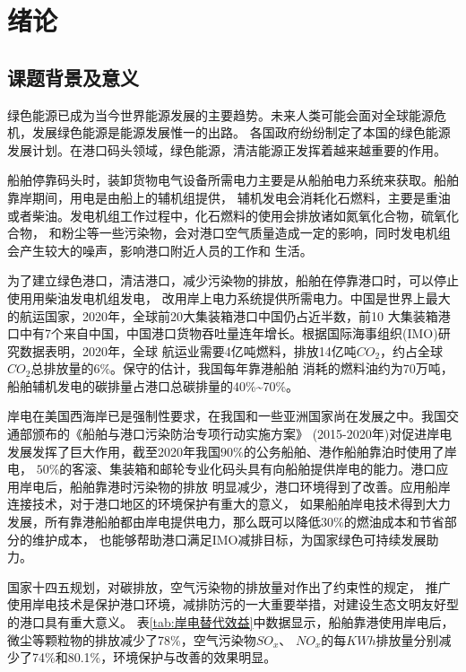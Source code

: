 \chapter{绪论}

\section{课题背景及意义}
绿色能源已成为当今世界能源发展的主要趋势。未来人类可能会面对全球能源危机，发展绿色能源是能源发展惟一的出路。
各国政府纷纷制定了本国的绿色能源发展计划。在港口码头领域，绿色能源，清洁能源正发挥着越来越重要的作用。

船舶停靠码头时，装卸货物电气设备所需电力主要是从船舶电力系统来获取。船舶靠岸期间，用电是由船上的辅机组提供，
辅机发电会消耗化石燃料，主要是重油或者柴油。发电机组工作过程中，化石燃料的使用会排放诸如氮氧化合物，硫氧化合物，
和粉尘等一些污染物，会对港口空气质量造成一定的影响，同时发电机组会产生较大的噪声，影响港口附近人员的工作和
生活。

为了建立绿色港口，清洁港口，减少污染物的排放，船舶在停靠港口时，可以停止使用用柴油发电机组发电，
改用岸上电力系统提供所需电力。中国是世界上最大的航运国家，2020年，全球前20大集装箱港口中国仍占近半数，前10
大集装箱港口中有7个来自中国，中国港口货物吞吐量连年增长。根据国际海事组织(IMO)研究数据表明，2020年，全球
航运业需要4亿吨燃料，排放14亿吨$CO_{2}$，约占全球$CO_{2}$总排放量的$6\%$。保守的估计，我国每年靠港船舶
消耗的燃料油约为$70$万吨，船舶辅机发电的碳排量占港口总碳排量的40\%\~{}70\%\cite{SP1}。

岸电在美国西海岸已是强制性要求，在我国和一些亚洲国家尚在发展之中。我国交通部颁布的《船舶与港口污染防治专项行动实施方案》
(2015-2020年)对促进岸电发展发挥了巨大作用，截至2020年我国$90\%$的公务船舶、港作船舶靠泊时使用了岸电，
$50\%$的客滚、集装箱和邮轮专业化码头具有向船舶提供岸电的能力。港口应用岸电后，船舶靠港时污染物的排放
明显减少，港口环境得到了改善。应用船岸连接技术，对于港口地区的环境保护有重大的意义，
如果船舶岸电技术得到大力发展，所有靠港船舶都由岸电提供电力，那么既可以降低$30\%$的燃油成本\cite{SP2}和节省部分的维护成本，
也能够帮助港口满足IMO减排目标，为国家绿色可持续发展助力。

国家十四五规划，对碳排放，空气污染物的排放量对作出了约束性的规定，
推广使用岸电技术是保护港口环境，减排防污的一大重要举措，对建设生态文明友好型的港口具有重大意义。
表\ref{tab:岸电替代效益}中数据显示，船舶靠港使用岸电后，微尘等颗粒物的排放减少了78\%，空气污染物$SO_{x}$、
$NO_{x}$的每$KWh$排放量分别减少了74\%和80.1\%，环境保护与改善的效果明显。

\begin{table}[!htp]
	\centering
	\caption[中国岸电替代辅机发电的减排表现]{中国岸电替代辅机发电的减排表现\cite{SP3}}
	\label{tab:岸电替代效益}
\end{table}

